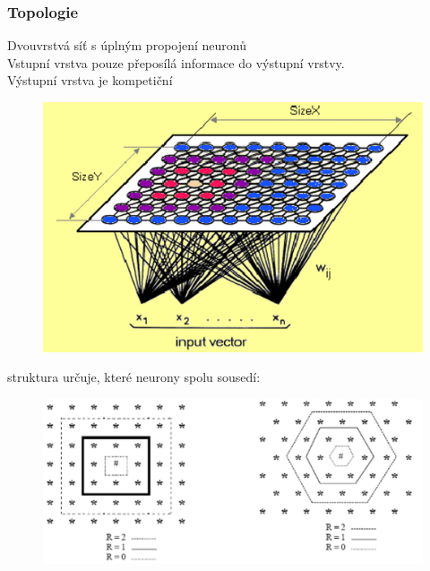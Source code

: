 \subsubsection{Topologie}
Dvouvrstvá síť s úplným propojení neuronů\\
Vstupní vrstva pouze přeposílá informace do výstupní vrstvy.\\
Výstupní vrstva je kompetiční\\
\begin{figure}[H]
    \includegraphics[scale = 0.3]{images/kohonen_topologie.png}
\end{figure}
struktura určuje, které neurony spolu sousedí:
\begin{figure}[H]
    \includegraphics[scale = 0.3]{images/kohonen_struktura.png}
\end{figure}

